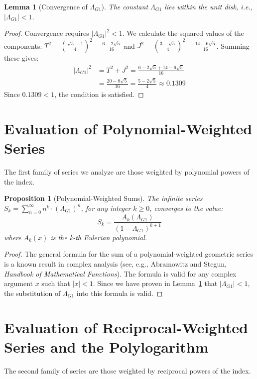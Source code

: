 \documentclass{amsart}
\theoremstyle{plain}
\newtheorem{proposition}[theorem]{Proposition}
\newtheorem{lemma}[theorem]{Lemma}
\theoremstyle{definition}
\theoremstyle{remark}
\newcommand{\LambdaG}{\Lambda_{G1}}
\begin{document}
\begin{lemma}[Convergence of $\LambdaG$]
\label{lem:convergence}
The constant $\LambdaG$ lies within the unit disk, i.e., $|\LambdaG| < 1$.
\end{lemma}
\begin{proof}
Convergence requires $|\LambdaG|^2 < 1$. We calculate the squared values of the components:
$T^2 = \left(\frac{\sqrt{5}-1}{4}\right)^2 = \frac{6-2\sqrt{5}}{16}$ and $J^2 = \left(\frac{3-\sqrt{5}}{4}\right)^2 = \frac{14-6\sqrt{5}}{16}$.
Summing these gives:
\begin{align*}
    |\LambdaG|^2 &= T^2+J^2 = \frac{6-2\sqrt{5} + 14-6\sqrt{5}}{16} \\
                 &= \frac{20-8\sqrt{5}}{16} = \frac{5-2\sqrt{5}}{4} \approx 0.1309
\end{align*}
Since $0.1309 < 1$, the condition is satisfied.
\end{proof}

\section{Evaluation of Polynomial-Weighted Series}
The first family of series we analyze are those weighted by polynomial powers of the index.

\begin{proposition}[Polynomial-Weighted Sums]
The infinite series $S_k = \sum_{n=0}^{\infty} n^k \cdot (\LambdaG)^n$, for any integer $k \ge 0$, converges to the value:
$$S_k = \frac{A_k(\LambdaG)}{(1-\LambdaG)^{k+1}}$$
where $A_k(x)$ is the k-th Eulerian polynomial.
\end{proposition}
\begin{proof}
The general formula for the sum of a polynomial-weighted geometric series is a known result in complex analysis (see, e.g., Abramowitz and Stegun, \textit{Handbook of Mathematical Functions}). The formula is valid for any complex argument $x$ such that $|x|<1$. Since we have proven in Lemma~\ref{lem:convergence} that $|\LambdaG|<1$, the substitution of $\LambdaG$ into this formula is valid.
\end{proof}

\section{Evaluation of Reciprocal-Weighted Series and the Polylogarithm}
The second family of series are those weighted by reciprocal powers of the index.
\end{document}
